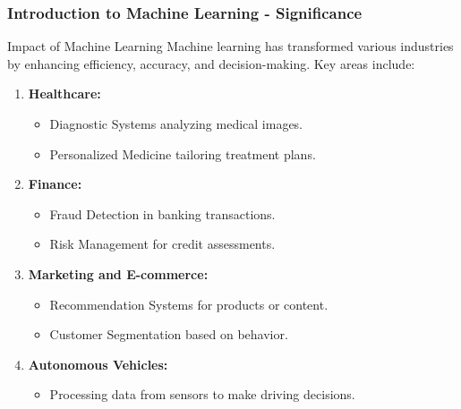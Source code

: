 \documentclass[aspectratio=169]{beamer}
\begin{document}
\begin{frame}[fragile]
    \frametitle{Introduction to Machine Learning - Significance}
    \begin{block}{Impact of Machine Learning}
        Machine learning has transformed various industries by enhancing efficiency, accuracy, and decision-making. Key areas include:
    \end{block}
    
    \begin{enumerate}
        \item \textbf{Healthcare:}
            \begin{itemize}
                \item Diagnostic Systems analyzing medical images.
                \item Personalized Medicine tailoring treatment plans.
            \end{itemize}
        \item \textbf{Finance:}
            \begin{itemize}
                \item Fraud Detection in banking transactions.
                \item Risk Management for credit assessments.
            \end{itemize}
        \item \textbf{Marketing and E-commerce:}
            \begin{itemize}
                \item Recommendation Systems for products or content.
                \item Customer Segmentation based on behavior.
            \end{itemize}
        \item \textbf{Autonomous Vehicles:}
            \begin{itemize}
                \item Processing data from sensors to make driving decisions.
            \end{itemize}
    \end{enumerate}
\end{frame}
\end{document}

